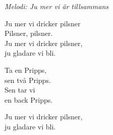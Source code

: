 {\footnotesize\textit{Melodi: Ju mer vi är tillsammans}}\par
\vspace{10pt}
Ju mer vi dricker pilsner\\
Pilsner, pilsner.\\
Ju mer vi dricker pilsner,\\
ju gladare vi bli.\par
\vspace{10pt}
Ta en Pripps,\\
sen två Pripps.\\
Sen tar vi \\
en back Pripps.\par
\vspace{10pt}
Ju mer vi dricker pilsner,\\
ju gladare vi bli.

